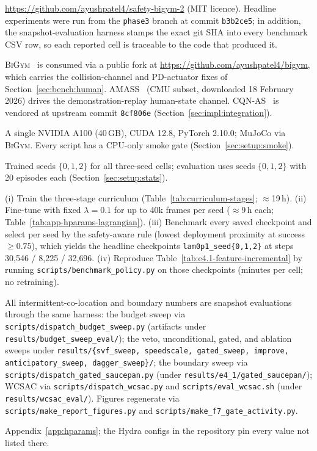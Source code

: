 \documentclass[11pt,a4paper]{report}
\newcommand{\bigym}{\textsc{BiGym}}
\newcommand{\cqnas}{CQN-AS}
\begin{document}
\begin{description}[leftmargin=2em,style=nextline]
\item[Code] \url{https://github.com/ayushpatel4/safety-bigym-2} (MIT
  licence). Headline experiments were run from the \texttt{phase3}
  branch at commit \texttt{b3b2ce5}; in addition, the
  snapshot-evaluation harness stamps the exact git SHA into every
  benchmark CSV row, so each reported cell is traceable to the code
  that produced it.
\item[Upstream assets] \bigym{}~\cite{chernyadev2024bigym} is consumed
  via a public fork at \url{https://github.com/ayushpatel4/bigym},
  which carries the collision-channel and PD-actuator fixes of
  Section~\ref{sec:bench:human}. AMASS~\cite{mahmood2019amass} (CMU
  subset, downloaded 18 February 2026) drives the demonstration-replay
  human-state channel. \cqnas{}~\cite{seo2024cqnas} is vendored at
  upstream commit \texttt{8cf806e}
  (Section~\ref{sec:impl:integration}).
\item[Hardware and software] A single NVIDIA A100 (40\,GB), CUDA 12.8,
  PyTorch 2.10.0; MuJoCo via \bigym{}. Every script has a CPU-only
  smoke gate (Section~\ref{sec:setup:smoke}).
\item[Seeds] Trained seeds $\{0, 1, 2\}$ for all three-seed cells;
  evaluation uses seeds $\{0, 1, 2\}$ with 20 episodes each
  (Section~\ref{sec:setup:stats}).
\item[Headline recipe (R1)] (i) Train the three-stage curriculum
  (Table~\ref{tab:curriculum-stages}; $\approx$19\,h). (ii) Fine-tune
  with fixed $\lambda = 0.1$ for up to 40k frames per seed
  ($\approx$9\,h each; Table~\ref{tab:app-hparams-lagrangian}).
  (iii) Benchmark every saved checkpoint and select per seed by the
  safety-aware rule (lowest deployment proximity at success
  $\ge 0.75$), which yields the headline checkpoints
  \texttt{lam0p1\_seed\{0,1,2\}} at steps 30{,}546 / 8{,}225 /
  32{,}696. (iv) Reproduce
  Table~\ref{tab:e4.1-feature-incremental} by running
  \texttt{scripts/benchmark\_policy.py} on those checkpoints
  (minutes per cell; no retraining).
\item[Headline recipe (R2/R3)] All intermittent-co-location and
  boundary numbers are snapshot evaluations through the same
  harness: the budget sweep via
  \texttt{scripts/dispatch\_budget\_sweep.py} (artifacts under
  \texttt{results/budget\_sweep\_eval/}); the veto, unconditional,
  gated, and ablation sweeps under \texttt{results/\{svf\_sweep,
  speedscale, gated\_sweep, improve, anticipatory\_sweep,
  dagger\_sweep\}/}; the boundary sweep via
  \texttt{scripts/dispatch\_gated\_saucepan.py} (under
  \texttt{results/e4\_1/gated\_saucepan/}); WCSAC via
  \texttt{scripts/dispatch\_wcsac.py} and
  \texttt{scripts/eval\_wcsac.sh} (under
  \texttt{results/wcsac\_eval/}). Figures regenerate via
  \texttt{scripts/make\_report\_figures.py} and
  \texttt{scripts/make\_f7\_gate\_activity.py}.
\item[Hyperparameters] Appendix~\ref{app:hparams}; the Hydra configs
  in the repository pin every value not listed there.
\end{description}
\end{document}
